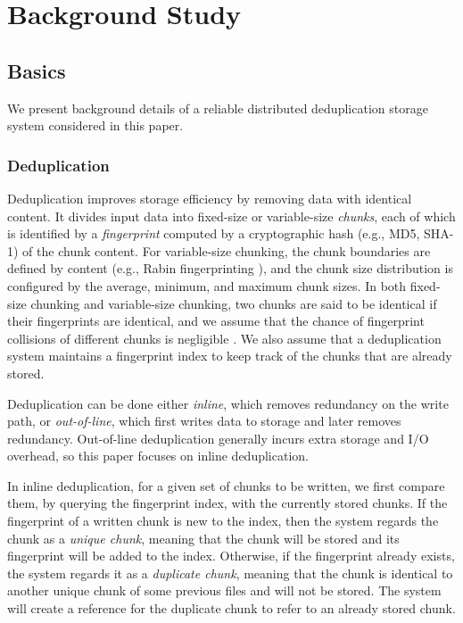 \chapter{Background Study}
\section{Basics}
\label{sec:background}

We present background details of a reliable distributed
deduplication storage system considered in this paper.  


\subsection{Deduplication}
\label{subsec:deduplication}

Deduplication \cite{quinlan02} improves storage efficiency by removing data
with identical content.  It divides input data into fixed-size or
variable-size {\em chunks}, each of which is identified by a {\em fingerprint}
computed by a cryptographic hash (e.g., MD5, SHA-1) of the chunk content.  For
variable-size chunking, the chunk boundaries are defined by content (e.g.,
Rabin fingerprinting \cite{rabin81}), and the chunk size distribution is
configured by the average, minimum, and maximum chunk sizes.  In both
fixed-size chunking and variable-size chunking, two chunks are said to be
identical if their fingerprints are identical, and we assume that the chance
of fingerprint collisions of different chunks is negligible \cite{quinlan02}.
We also assume that a deduplication system maintains a fingerprint index to
keep track of the chunks that are already stored.  

Deduplication can be done either {\em inline}, which removes redundancy on the
write path, or {\em out-of-line}, which first writes data to storage and later
removes redundancy.  Out-of-line deduplication generally incurs extra storage
and I/O overhead, so this paper focuses on inline deduplication.

In inline deduplication, for a given set of chunks to be written, we first
compare them, by querying the fingerprint index, with the currently stored
chunks.  If the fingerprint of a written chunk is new to the index, then the
system regards the chunk as a {\em unique chunk}, meaning that the chunk will
be stored and its fingerprint will be added to the index.  Otherwise, if the
fingerprint already exists, the system regards it as a {\em duplicate chunk},
meaning that the chunk is identical to another unique chunk of some previous
files and will not be stored.   The system will create a reference for the
duplicate chunk to refer to an already stored chunk. 

